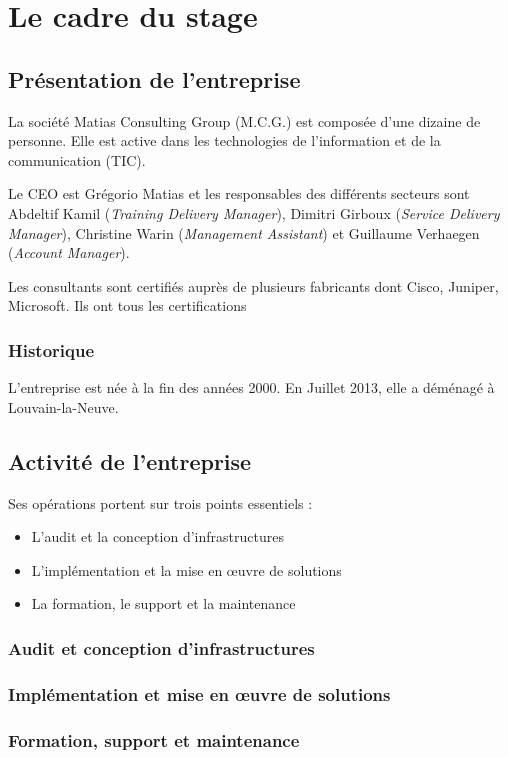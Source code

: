 \chapter{Le cadre du stage}
\section{Présentation de l'entreprise}
La société Matias Consulting Group (M.C.G.) est composée d'une dizaine de personne. 
Elle est active dans les technologies de l'information et de la communication (TIC).

Le CEO est Grégorio Matias et les responsables des différents secteurs sont Abdeltif Kamil (\textit{Training Delivery Manager}), Dimitri Girboux (\textit{Service Delivery Manager}), Christine Warin (\textit{Management Assistant}) et Guillaume Verhaegen (\textit{Account Manager}).

Les consultants sont certifiés auprès de plusieurs fabricants dont Cisco, Juniper, Microsoft.
Ils ont tous les certifications 
\subsection{Historique}
L'entreprise est née à la fin des années 2000.
En Juillet 2013, elle a déménagé à Louvain-la-Neuve.

\section{Activité de l'entreprise}

Ses opérations portent sur trois points essentiels : 
\begin{itemize}
	\item L'audit et la conception d'infrastructures
	\item L'implémentation et la mise en œuvre de solutions
	\item La formation, le support et la maintenance
\end{itemize}

\subsection{Audit et conception d'infrastructures}

\subsection{Implémentation et mise en œuvre de solutions}

\subsection{Formation, support et maintenance}